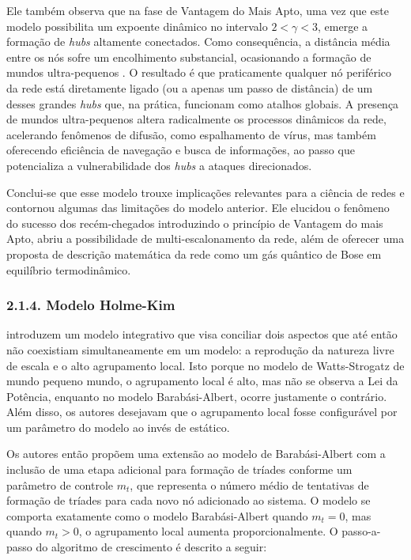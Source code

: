 \documentclass[12pt,oneside,a4paper,brazil,sumario=tradicional]{abntex2}
\begin{document}
Ele também observa que na fase de Vantagem do Mais Apto, uma vez que este modelo possibilita um expoente dinâmico no intervalo $2 < \gamma < 3$, emerge a formação de \textit{hubs }altamente conectados. Como consequência, a distância média entre os nós sofre um encolhimento substancial, ocasionando a formação de mundos ultra-pequenos \parencite{cohen2003}. O resultado é que praticamente qualquer nó periférico da rede está diretamente ligado (ou a apenas um passo de distância) de um desses grandes \textit{hubs} que, na prática, funcionam como atalhos globais. A presença de mundos ultra-pequenos altera radicalmente os processos dinâmicos da rede, acelerando fenômenos de difusão, como espalhamento de vírus, mas também oferecendo eficiência de navegação e busca de informações, ao passo que potencializa a vulnerabilidade dos \textit{hubs }a ataques direcionados.

Conclui-se que esse modelo trouxe implicações relevantes para a ciência de redes e contornou algumas das limitações do modelo anterior. Ele elucidou o fenômeno do sucesso dos recém-chegados introduzindo o princípio de Vantagem do mais Apto, abriu a possibilidade de multi-escalonamento da rede, além de oferecer uma proposta de descrição matemática da rede como um gás quântico de Bose em equilíbrio termodinâmico.

\subsubsection*{2.1.4. Modelo Holme-Kim}
\textcite{holme2002} introduzem um modelo integrativo que visa conciliar dois aspectos que até então não coexistiam simultaneamente em um modelo:\textit{ }a reprodução da natureza livre de escala e o alto agrupamento local. Isto porque no modelo de Watts-Strogatz de mundo pequeno mundo, o agrupamento local é alto, mas não se observa a Lei da Potência, enquanto no modelo Barabási-Albert, ocorre justamente o contrário. Além disso, os autores desejavam que o agrupamento local fosse configurável por um parâmetro do modelo ao invés de estático.

Os autores então propõem uma extensão ao modelo de Barabási-Albert com a inclusão de uma etapa adicional para formação de tríades conforme um parâmetro de controle $m_{t}$, que representa o número médio de tentativas de formação de tríades para cada novo nó adicionado ao sistema. O modelo se comporta exatamente como o modelo Barabási-Albert quando $m_{t} = 0$, mas quando $m_{t} > 0$, o agrupamento local aumenta proporcionalmente. O passo-a-passo do algoritmo de crescimento é descrito a seguir:
\end{document}
